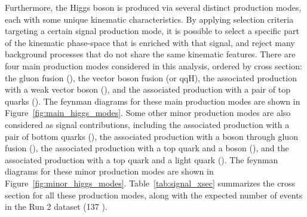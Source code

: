 Furthermore, the Higgs boson is produced via several distinct production modes, each with some unique kinematic characteristics. 
By applying selection criteria targeting a certain signal production mode, it is possible to select a specific part of the kinematic phase-space that is enriched with that signal, 
and reject many background processes that do not share the same kinematic features. 
There are four main production modes considered in this analysis, ordered by cross section: the gluon fusion (\ggH), the vector boson fusion (\qqH or qqH), 
the associated production with a weak vector boson (\VH), and the associated production with a pair of top quarks (\ttH). 
The feynman diagrams for these main production modes are shown in Figure~\ref{fig:main_higgs_modes}.
Some other minor production modes are also considered as signal contributions, including the associated production with a pair of bottom quarks (\bbH),
the associated production with a \PZ boson through gluon fusion (\ggZH), the associated production with a top quark and a \PW boson (\tHW), 
and the associated production with a top quark and a light quark (\tHq). 
The feynman diagrams for these minor production modes are shown in Figure~\ref{fig:minor_higgs_modes}.
Table~\ref{tab:signal_xsec} summarizes the cross section for all these production modes, 
along with the expected number of events in the Run 2 dataset (137 \invfb).

